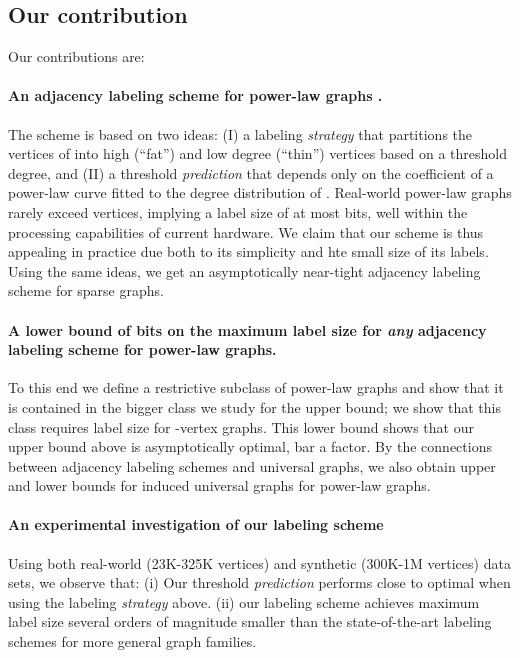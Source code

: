 \documentclass{article}
\theoremstyle{remark}
\begin{document}
\subsection{Our contribution}

Our contributions are:

\paragraph{An   adjacency labeling scheme for power-law graphs .}
The scheme is based on two ideas:
(I) a labeling \emph{strategy} that  partitions the vertices of  into high (``fat'') and low degree (``thin'') vertices based on a threshold degree, and (II) a threshold \emph{prediction} that depends only on the coefficient  of a power-law curve fitted to the degree distribution of . 
Real-world power-law graphs rarely exceed   vertices, implying a label size of at most   bits, well within the processing capabilities of current hardware. 
We claim that our  scheme is thus appealing in practice   due both to  its simplicity and hte small size of its labels.
Using the same ideas, we get an  asymptotically near-tight   adjacency labeling scheme for sparse graphs.


\paragraph{A lower bound of  bits on the maximum label size for \emph{any} adjacency labeling scheme for power-law graphs.}
To this end we define a  restrictive subclass of power-law graphs and show that it is contained in the bigger class we study for the upper bound; we show that this class requires label size  for -vertex graphs.
This lower bound shows that our upper bound above is asymptotically  optimal, bar a  factor.
By the connections between adjacency labeling schemes and universal graphs, we also obtain upper and lower bounds for induced universal graphs for power-law graphs. 


\paragraph{An experimental investigation  of our labeling scheme}
Using both real-world (23K-325K vertices) and synthetic (300K-1M vertices) data sets, we observe that:
(i) Our threshold \emph{prediction} performs close to optimal when using the labeling \emph{strategy} above. 
(ii) our labeling scheme achieves maximum label size several orders of magnitude smaller than the state-of-the-art labeling schemes for more general graph families.
\vspace{\baselineskip}
\end{document}
